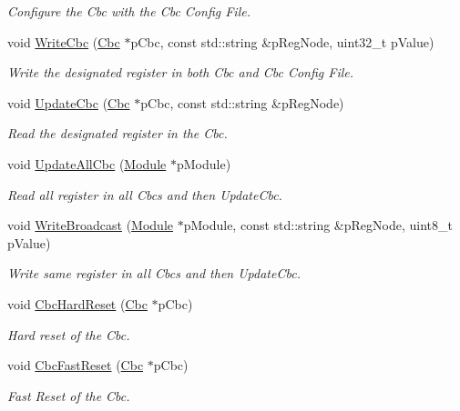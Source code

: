 \begin{DoxyCompactItemize}
\begin{DoxyCompactList}\small\item\em Configure the Cbc with the Cbc Config File. \end{DoxyCompactList}\item 
void \hyperlink{class_ph2___hw_interface_1_1_cbc_interface_afcde3c318e031defea6f28660cfcba9f}{Write\-Cbc} (\hyperlink{class_ph2___hw_description_1_1_cbc}{Cbc} $\ast$p\-Cbc, const std\-::string \&p\-Reg\-Node, uint32\-\_\-t p\-Value)
\begin{DoxyCompactList}\small\item\em Write the designated register in both Cbc and Cbc Config File. \end{DoxyCompactList}\item 
void \hyperlink{class_ph2___hw_interface_1_1_cbc_interface_ac2c24e9993f4c2d6b59748fabfb439e5}{Update\-Cbc} (\hyperlink{class_ph2___hw_description_1_1_cbc}{Cbc} $\ast$p\-Cbc, const std\-::string \&p\-Reg\-Node)
\begin{DoxyCompactList}\small\item\em Read the designated register in the Cbc. \end{DoxyCompactList}\item 
void \hyperlink{class_ph2___hw_interface_1_1_cbc_interface_a2c9f30c3546a3337db1fc5e7fd5cb90c}{Update\-All\-Cbc} (\hyperlink{class_ph2___hw_description_1_1_module}{Module} $\ast$p\-Module)
\begin{DoxyCompactList}\small\item\em Read all register in all Cbcs and then Update\-Cbc. \end{DoxyCompactList}\item 
void \hyperlink{class_ph2___hw_interface_1_1_cbc_interface_af4a7fb33df95b0052bf5046910676aec}{Write\-Broadcast} (\hyperlink{class_ph2___hw_description_1_1_module}{Module} $\ast$p\-Module, const std\-::string \&p\-Reg\-Node, uint8\-\_\-t p\-Value)
\begin{DoxyCompactList}\small\item\em Write same register in all Cbcs and then Update\-Cbc. \end{DoxyCompactList}\item 
void \hyperlink{class_ph2___hw_interface_1_1_cbc_interface_a0e9a7f5c0a444cb8ca14f3a90cd9e759}{Cbc\-Hard\-Reset} (\hyperlink{class_ph2___hw_description_1_1_cbc}{Cbc} $\ast$p\-Cbc)
\begin{DoxyCompactList}\small\item\em Hard reset of the Cbc. \end{DoxyCompactList}\item 
void \hyperlink{class_ph2___hw_interface_1_1_cbc_interface_ae2166f5bd24481d88bdd015d1db08051}{Cbc\-Fast\-Reset} (\hyperlink{class_ph2___hw_description_1_1_cbc}{Cbc} $\ast$p\-Cbc)
\begin{DoxyCompactList}\small\item\em Fast Reset of the Cbc. \end{DoxyCompactList}\end{DoxyCompactItemize}

